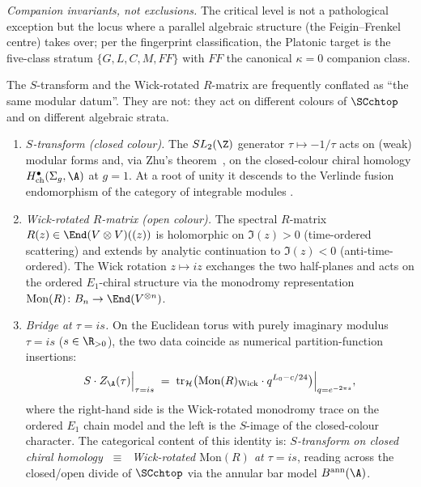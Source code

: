 \begin{remark}
\emph{Companion invariants, not exclusions.} The critical level
is not a pathological exception but the locus where a parallel
algebraic structure (the Feigin--Frenkel centre) takes over; per the
fingerprint classification, the Platonic target is the five-class
stratum $\{G,L,C,M,FF\}$ with $FF$ the canonical $\kappa=0$ companion
class.
\end{remark}

\begin{remark}
\label{rem:s-transform-vs-wick-rotation-bridge}
The $S$-transform and the Wick-rotated $R$-matrix are frequently
conflated as ``the same modular datum''. They are not: they act on
different colours of $\SCchtop$ and on different algebraic strata.
\begin{enumerate}[label=(\alph*)]
\item \emph{$S$-transform (closed colour).} The $SL_2(\Z)$ generator
 $\tau \mapsto -1/\tau$ acts on (weak) modular forms and, via Zhu's
 theorem~\cite{Zhu96}, on the closed-colour chiral homology
 $H^\bullet_{\mathrm{ch}}(\Sigma_g, \A)$ at $g=1$. At a root of
 unity it descends to the Verlinde fusion endomorphism of the
 category of integrable modules
 \cite{FrenkelZhu92,HuangLepowskyKong}.
\item \emph{Wick-rotated $R$-matrix (open colour).} The spectral
 $R$-matrix $R(z) \in \End(V \otimes V)((z))$ is holomorphic on
 $\Im(z) > 0$ (time-ordered scattering) and extends by analytic
 continuation to $\Im(z) < 0$ (anti-time-ordered). The Wick
 rotation $z \mapsto iz$ exchanges the two half-planes and acts on
 the ordered $E_1$-chiral structure via the monodromy representation
 $\mathrm{Mon}(R) \colon B_n \to \End(V^{\otimes n})$.
\item \emph{Bridge at $\tau = is$.} On the Euclidean torus with
 purely imaginary modulus $\tau = is$ ($s \in \R_{>0}$), the two
 data coincide as numerical partition-function insertions:
 \[
 S \cdot Z_{\A}(\tau) \Big|_{\tau = is}
 \;=\; \mathrm{tr}_{\mathcal H} \bigl(
 \mathrm{Mon}(R)_{\mathrm{Wick}} \cdot q^{L_0 - c/24}
 \bigr) \Big|_{q = e^{-2\pi s}},
 \]
 where the right-hand side is the Wick-rotated monodromy trace
 on the ordered $E_1$ chain model and the left is the $S$-image
 of the closed-colour character. The categorical content of this
 identity is:
 \emph{$S$-transform on closed chiral homology
 $\;\equiv\;$ Wick-rotated $\mathrm{Mon}(R)$ at $\tau = is$},
 reading across the closed/open divide of $\SCchtop$ via the
 annular bar model $B^{\mathrm{ann}}(\A)$.

\end{enumerate}
\end{remark}
